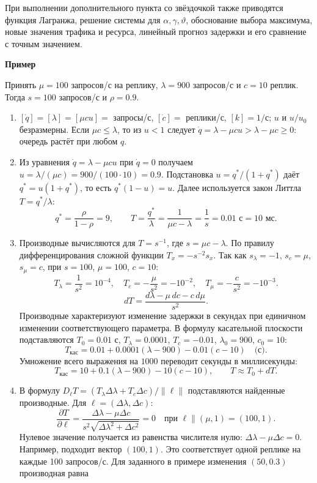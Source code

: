 \documentclass[12pt,a4paper]{article}
\newcommand{\taskhead}[1]{\par\textbf{#1}\par}
\begin{document}
При выполнении дополнительного пункта со звёздочкой также приводятся
функция Лагранжа, решение системы для $\alpha,\gamma,\vartheta$,
обоснование выбора максимума, новые значения трафика и ресурса,
линейный прогноз задержки и его сравнение с точным значением.

\taskhead{Пример}
Принять $\mu=100$ запросов/с на реплику, $\lambda=900$ запросов/с и $c=10$ реплик. Тогда $s=100$ запросов/с и $\rho=0.9$.
\begin{enumerate}
\item $[\dot q]=[\lambda]=[\mu cu]=$ запросы/с,
$[\dot c]=$ реплики/с, $[k]=1/\text{с}$; $u$ и $u/u_0$ безразмерны.
Если $\mu c\leq\lambda$, то из $u<1$ следует
$\dot q=\lambda-\mu cu>\lambda-\mu c\geq0$: очередь растёт при любом $q$.
\item Из уравнения $\dot q=\lambda-\mu cu$ при $\dot q=0$ получаем
$u=\lambda/(\mu c)=900/(100\cdot10)=0.9$.
Подстановка $u=q^*/(1+q^*)$ даёт $q^*=u(1+q^*)$, то есть
$q^*(1-u)=u$. Далее используется закон Литтла $T=q^*/\lambda$:
\[
q^*=\frac{\rho}{1-\rho}=9,\qquad
T=\frac{q^*}{\lambda}=\frac{1}{\mu c-\lambda}=\frac1s=0.01\text{ с}=10\text{ мс}.
\]
\item Производные вычисляются для $T=s^{-1}$, где $s=\mu c-\lambda$.
По правилу дифференцирования сложной функции $T_x=-s^{-2}s_x$.
Так как $s_\lambda=-1$, $s_c=\mu$, $s_\mu=c$, при $s=100$, $\mu=100$, $c=10$:
\[
T_\lambda=\frac1{s^2}=10^{-4},\quad T_c=-\frac\mu{s^2}=-10^{-2},\quad
T_\mu=-\frac c{s^2}=-10^{-3}.
\]
\[
dT=\frac{d\lambda-\mu\,dc-c\,d\mu}{s^2}.
\]
Производные характеризуют изменение задержки в секундах при единичном
изменении соответствующего параметра.
В формулу касательной плоскости подставляются $T_0=0.01$ с,
$T_\lambda=0.0001$, $T_c=-0.01$, $\lambda_0=900$, $c_0=10$:
\[
T_{\mathrm{кас}}=0.01+0.0001(\lambda-900)-0.01(c-10)\quad\text{(с)}.
\]
Умножение всего выражения на $1000$ переводит секунды в миллисекунды:
\[
T_{\mathrm{кас}}=10+0.1(\lambda-900)-10(c-10),\qquad T\approx T_0+dT.
\]
\item В формулу $D_\ell T=(T_\lambda\Delta\lambda+T_c\Delta c)/\|\ell\|$
подставляются найденные производные. Для $\ell=(\Delta\lambda,\Delta c)$:
\[
\frac{\partial T}{\partial\ell}
=\frac{\Delta\lambda-\mu\Delta c}{s^2\sqrt{\Delta\lambda^2+\Delta c^2}}=0
\quad\text{при }\ell\parallel(\mu,1)=(100,1).
\]
Нулевое значение получается из равенства числителя нулю:
$\Delta\lambda-\mu\Delta c=0$. Например, подходит вектор $(100,1)$.
Это соответствует одной реплике на каждые 100 запросов/с.
Для заданного в примере изменения $(50,0.3)$ производная равна

\end{enumerate}
\end{document}
